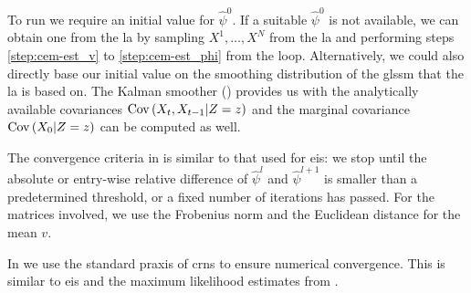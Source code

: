 To run  we require an initial value for $\hat\psi^{0}$. If a suitable $\hat\psi^{0}$ is not available, we can obtain one from the \gls{la} by sampling $X^{1}, \dots, X^{N}$ from the \gls{la} and performing steps \ref{step:cem-est_v} to \ref{step:cem-est_phi} from the loop.
Alternatively, we could also directly base our initial value on the smoothing distribution of the \gls{glssm} that the \gls{la} is based on. The Kalman smoother () provides us with the analytically available covariances $\operatorname{Cov} \left( X_{t}, X_{t - 1} | Z = z \right)$ and the marginal covariance $\operatorname{Cov} \left( X_{0} | Z = z \right)$ can be computed as well. 

The convergence criteria in  is similar to that used for \gls{eis}: we stop until the absolute or entry-wise relative difference of $\hat\psi^{l}$ and $\hat \psi^{l + 1}$ is smaller than a predetermined threshold, or a fixed number of iterations has passed. For the matrices involved, we use the Frobenius norm and the Euclidean distance for the mean $v$. 

In  we use the standard praxis of \glspl{crn} to ensure numerical convergence. This is similar to \gls{eis} and the maximum likelihood estimates from .

